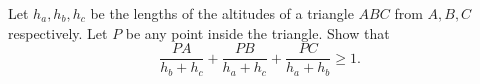 Let $h_a, h_b, h_c$ be the lengths of the altitudes of a triangle $ABC$ from $A, B, C$ respectively. Let $P$ be any point inside the triangle. Show that \[\frac{PA}{h_b+h_c} + \frac{PB}{h_a+h_c} + \frac{PC}{h_a+h_b} \ge 1.\]